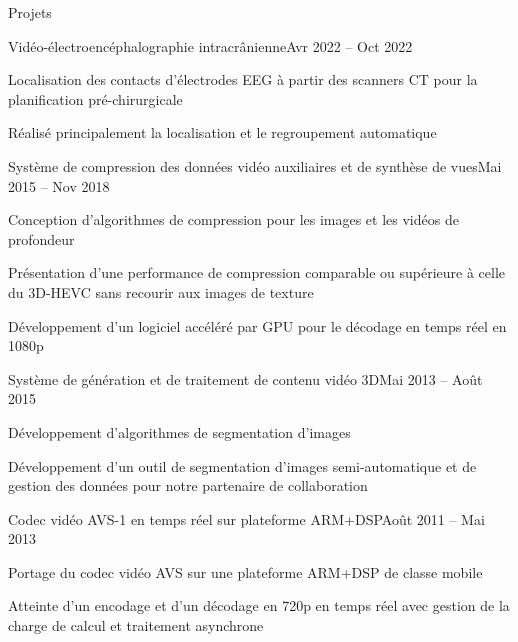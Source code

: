 \documentclass{resume} %
\begin{document}
\begin{rSection}{Projets}

	\begin{rSubsection}{Vidéo-électroencéphalographie intracrânienne}{Avr 2022 -- Oct 2022}{}{}
		\item Localisation des contacts d'électrodes EEG à partir des scanners CT pour la planification pré-chirurgicale
		\item Réalisé principalement la localisation et le regroupement automatique
	\end{rSubsection}

	\begin{rSubsection}{Système de compression des données vidéo auxiliaires et de synthèse de vues}{Mai 2015 -- Nov 2018}{}{}
		\item Conception d'algorithmes de compression pour les images et les vidéos de profondeur
		\item Présentation d'une performance de compression comparable ou supérieure à celle du 3D-HEVC sans recourir aux images de texture
		\item Développement d'un logiciel accéléré par GPU pour le décodage en temps réel en 1080p
	\end{rSubsection}
		
	\begin{rSubsection}{Système de génération et de traitement de contenu vidéo 3D}{Mai 2013 -- Août 2015}{}{}
		\item Développement d'algorithmes de segmentation d'images
		\item Développement d'un outil de segmentation d'images semi-automatique et de gestion des données pour notre partenaire de collaboration
	\end{rSubsection}
		
	\begin{rSubsection}{Codec vidéo AVS-1 en temps réel sur plateforme ARM+DSP}{Août 2011 -- Mai 2013}{}{}
		\item Portage du codec vidéo AVS sur une plateforme ARM+DSP de classe mobile
		\item Atteinte d'un encodage et d'un décodage en 720p en temps réel avec gestion de la charge de calcul et traitement asynchrone
	\end{rSubsection}

\end{rSection}

\end{document}
